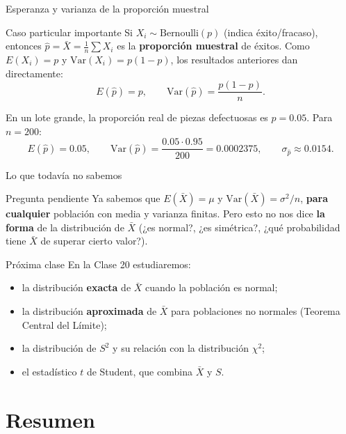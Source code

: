 \documentclass[aspectratio=169,11pt]{beamer}
\begin{document}
\begin{frame}{Esperanza y varianza de la proporción muestral}
\begin{block}{Caso particular importante}
Si $X_i \sim \text{Bernoulli}(p)$ (indica éxito/fracaso), entonces $\hat p = \bar X = \frac{1}{n}\sum X_i$ es la \textbf{proporción muestral} de éxitos. Como $E(X_i)=p$ y $\text{Var}(X_i)=p(1-p)$, los resultados anteriores dan directamente:
$$E(\hat p) = p, \qquad \text{Var}(\hat p) = \frac{p(1-p)}{n}.$$
\end{block}

\begin{example}
En un lote grande, la proporción real de piezas defectuosas es $p=0.05$. Para $n=200$:
$$E(\hat p) = 0.05, \qquad \text{Var}(\hat p) = \frac{0.05\cdot 0.95}{200} = 0.0002375, \qquad \sigma_{\hat p}\approx 0.0154.$$
\end{example}
\end{frame}

\begin{frame}{Lo que todavía no sabemos}
\begin{alertblock}{Pregunta pendiente}
Ya sabemos que $E(\bar X)=\mu$ y $\text{Var}(\bar X)=\sigma^2/n$, \textbf{para cualquier} población con media y varianza finitas. Pero esto no nos dice \textbf{la forma} de la distribución de $\bar X$ (¿es normal?, ¿es simétrica?, ¿qué probabilidad tiene $\bar X$ de superar cierto valor?).
\end{alertblock}

\begin{block}{Próxima clase}
En la Clase 20 estudiaremos:
\begin{itemize}
\item la distribución \textbf{exacta} de $\bar X$ cuando la población es normal;
\item la distribución \textbf{aproximada} de $\bar X$ para poblaciones no normales (Teorema Central del Límite);
\item la distribución de $S^2$ y su relación con la distribución $\chi^2$;
\item el estadístico $t$ de Student, que combina $\bar X$ y $S$.
\end{itemize}
\end{block}
\end{frame}

\section{Resumen}
\end{document}
